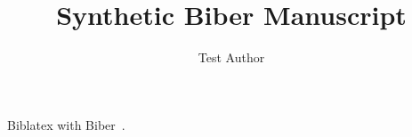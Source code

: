 \documentclass{article}
\title{Synthetic Biber Manuscript}
\author{Test Author}
\begin{document}
\maketitle
Biblatex with Biber~\cite{lamport1994}.
\printbibliography
\end{document}
